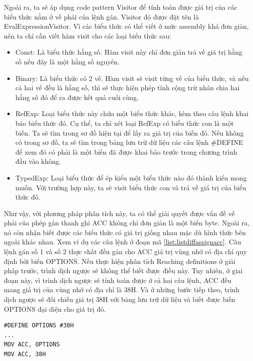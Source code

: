 Ngoài ra, ta sẽ áp dụng code pattern Visitor để tính toán được giá trị của các biểu thức nằm ở vế phải của lệnh gán. Visitor đó được đặt tên là EvalExpressionVisitor. Vì các biểu thức có thể viết ở mức assembly khá đơn giản, nên ta chỉ cần viết hàm visit cho các loại biểu thức sau:

\begin{itemize}
	\item Const: Là biểu thức hằng số. Hàm visit này chỉ đơn giản trả về giá trị hằng số nếu đây là một hằng số nguyên.
	\item Binary: Là biểu thức có 2 vế. Hàm visit sẽ visit từng vế của biểu thức, và nếu cả hai vế đều là hằng số, thì sẽ thực hiện phép tính cộng trừ nhân chia hai hằng số đó để ra được kết quả cuối cùng.
	\item RefExp: Loại biểu thức này chứa một biểu thức khác, kèm theo câu lệnh khai báo biểu thức đó. Cụ thể, ta chỉ xét loại RefExp có biểu thức con là một biến. Ta sẽ tìm trong sơ đồ hiện tại để lấy ra giá trị của biến đó. Nếu không có trong sơ đồ, ta sẽ tìm trong bảng lưu trữ dữ liệu các câu lệnh \#DEFINE để xem đó có phải là một biến đã được khai báo trước trong chương trình đầu vào không.
	\item TypedExp: Loại biểu thức để ép kiểu một biểu thức nào đó thành kiểu mong muốn. Với trường hợp này, ta sẽ visit biểu thức con và trả về giá trị của biểu thức đó.
\end{itemize}


Như vậy, với phương pháp phân tích này, ta có thể giải quyết được vấn đề vế phải của phép gán thanh ghi ACC không chỉ đơn giản là một biến byte. Ngoài ra, nó còn nhận biết được các biểu thức có giá trị giống nhau mặc dù hình thức bên ngoài khác nhau. Xem ví dụ các câu lệnh ở đoạn mã \ref{list:listdiffassignacc}. Câu lệnh gán số 1 và số 2 thực chất đều gán cho ACC giá trị vùng nhớ có địa chỉ quy định bởi biến OPTIONS. Nếu thực hiện phân tích Reaching definitions ở giải pháp trước, trình dịch ngược sẽ không thể biết được điều này. Tuy nhiên, ở giai đoạn này, vì trình dịch ngược sẽ tính toán được ở cả hai câu lệnh, ACC đều mang giá trị của vùng nhớ có địa chỉ là 38H. Và ở những bước tiếp theo, trình dịch ngược sẽ đối chiếu giá trị 38H với bảng lưu trữ dữ liệu và biết được biến OPTIONS đại diện cho giá trị đó.

\begin{lstlisting}[caption={Một số câu lệnh gán cho ACC có giá trị vế phải bằng nhau},label={list:listdiffassignacc}]
#DEFINE OPTIONS #38H
...
MOV ACC, OPTIONS
MOV ACC, 38H
\end{lstlisting}

